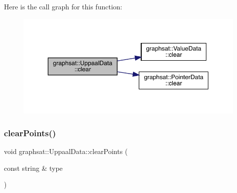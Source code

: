 Here is the call graph for this function\+:\nopagebreak
\begin{figure}[H]
\begin{center}
\leavevmode
\includegraphics[width=343pt]{classgraphsat_1_1_uppaal_data_a470caa8beeb50129e99a4ca086bc71c0_cgraph}
\end{center}
\end{figure}
\mbox{\label{classgraphsat_1_1_uppaal_data_aa8135b656e806c6c246c45ee88d227fd}} 
\subsubsection{\texorpdfstring{clearPoints()}{clearPoints()}\hspace{0.1cm}{\footnotesize\ttfamily [1/2]}}
{\footnotesize\ttfamily void graphsat\+::\+Uppaal\+Data\+::clear\+Points (\begin{DoxyParamCaption}\item[{const string \&}]{type }\end{DoxyParamCaption})\hspace{0.3cm}{\ttfamily [inline]}}


